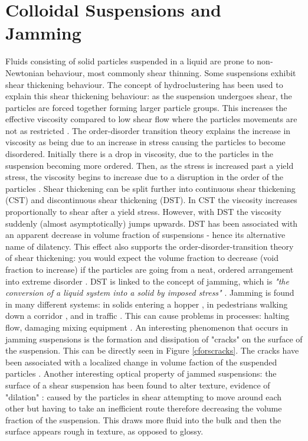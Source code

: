 \documentclass[twoside,a4]{report}
\def\br{\newline \newline \noindent}
\begin{document}
	\section*{Colloidal Suspensions and Jamming} %
	Fluids consisting of solid particles suspended in a liquid are prone to non-Newtonian behaviour, most commonly shear thinning. Some suspensions exhibit shear thickening behaviour. The concept of hydroclustering has been used to explain this shear thickening behaviour: as the suspension undergoes shear, the particles are forced together forming larger particle groups. This increases the effective viscosity compared to low shear flow where the particles movements are not as restricted \cite{figshearthick}. The order-disorder transition  theory explains the increase in viscosity as being due to an increase in stress causing the particles to become disordered. Initially there is a drop in viscosity, due to the particles in the suspension becoming more ordered. Then, as the stress is increased past a yield stress, the viscosity begins to increase due to a disruption in the order of the particles \cite{backbrownjaegrev}. %
	\br
	Shear thickening can be split further into continuous shear thickening (CST) and discontinuous shear thickening (DST). In CST the viscosity increases proportionally to shear after a yield stress. However, with DST the viscosity suddenly (almost asymptotically) jumps upwards. DST has been associated with an apparent decrease in volume fraction of suspensions - hence its alternative name of dilatency. This effect also supports the order-disorder-transition theory of shear thickening: you would expect the volume fraction to decrease (void fraction to increase) if the particles are going from a neat, ordered arrangement into extreme disorder \cite{backbrownjaegrev}. 
	\br
	DST is linked to the concept of jamming, which is \textit{"the conversion of a liquid system into a solid by imposed stress"} \cite{backhawjam}. Jamming is found in many different systems: in solids entering a hopper \cite{back2djam}, in pedestrians walking down a corridor \cite{backpedjam}, and in traffic \cite{backcarjam}. This can cause problems in processes: halting flow, damaging mixing equipment \cite{backshearjambertrand}.
	\br 
	An interesting phenomenon that occurs in jamming suspensions is the formation and dissipation of "cracks" on the surface of the suspension. This can be directly seen in Figure \ref{cforscracks}. The cracks have been associated with a localized change in volume faction of the suspended particles \cite{backhawjam}. Another interesting optical property of jammed suspensions: the surface of a shear suspension has been found to alter texture, evidence of "dilation" \cite{backbrownjaegrev}: caused by the particles in shear attempting to move around each other but having to take an inefficient route therefore decreasing the volume fraction of the suspension. This draws more fluid into the bulk and then the surface appears rough in texture, as opposed to glossy. 
	
\end{document}
